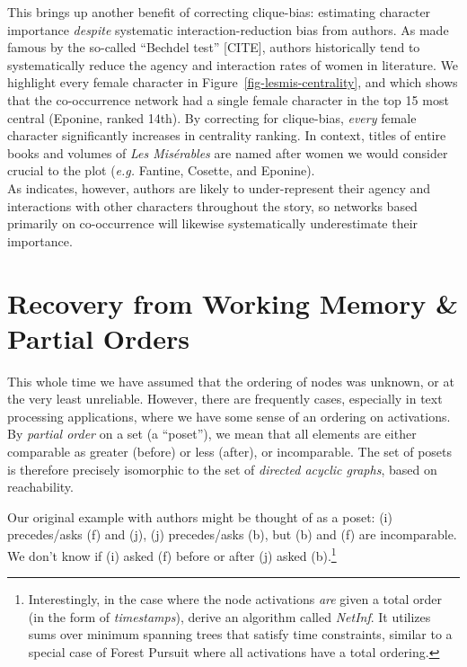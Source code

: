 \documentclass[%
	12pt,
		oneside,
		letterpaper
]{book}
\begin{document}
This brings up another benefit of correcting clique-bias: estimating
character importance \emph{despite} systematic interaction-reduction
bias from authors. As made famous by the so-called ``Bechdel test''
{[}CITE{]}, authors historically tend to systematically reduce the
agency and interaction rates of women in
literature\autocite{genderagencygap_Stuhler2024}. We highlight every
female character in Figure~\ref{fig-lesmis-centrality}, and which shows
that the co-occurrence network had a single female character in the top
15 most central (Eponine, ranked 14th). By correcting for clique-bias,
\emph{every} female character significantly increases in centrality
ranking. In context, titles of entire books and volumes of \emph{Les
Misérables} are named after women we would consider crucial to the plot
(\emph{e.g.} Fantine, Cosette, and Eponine).\\
As \textcite{genderagencygap_Stuhler2024} indicates, however, authors
are likely to under-represent their agency and interactions with other
characters throughout the story, so networks based primarily on
co-occurrence will likewise systematically underestimate their
importance.

\chapter{Recovery from Working Memory \& Partial
Orders}\label{sec-ordered}

This whole time we have assumed that the ordering of nodes was unknown,
or at the very least unreliable. However, there are frequently cases,
especially in text processing applications, where we have some sense of
an ordering on activations. By \emph{partial order} on a set (a
``poset''), we mean that all elements are either comparable as greater
(before) or less (after), or incomparable. The set of posets is
therefore precisely isomorphic to the set of \emph{directed acyclic
graphs}, based on reachability.

Our original example with authors might be thought of as a poset: (i)
precedes/asks (f) and (j), (j) precedes/asks (b), but (b) and (f) are
incomparable. We don't know if (i) asked (f) before or after (j) asked
(b).\footnote{ Interestingly, in the case where the node activations
  \emph{are} given a total order (in the form of \emph{timestamps}),
  \textcite{Inferringnetworksdiffusion_GomezRodriguez2012} derive an
  algorithm called \emph{NetInf}. It utilizes sums over minimum spanning
  trees that satisfy time constraints, similar to a special case of
  Forest Pursuit where all activations have a total ordering.}
\end{document}
